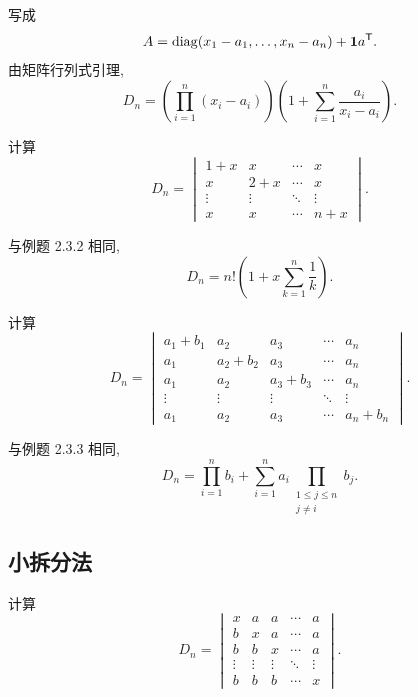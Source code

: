 \begin{solution}
写成
\[
A
=
\operatorname{diag}(x_1-a_1,\ldots,x_n-a_n)
+
\boldsymbol{1}a^{\mathsf T}.
\]
由矩阵行列式引理,
\[
\boxed{
D_n
=
\left(
\prod\limits_{i=1}^{n}(x_i-a_i)
\right)
\left(
1+
\sum\limits_{i=1}^{n}\dfrac{a_i}{x_i-a_i}
\right)
}.
\]
\end{solution}


\begin{example}
计算
\[
D_n=
\begin{vmatrix}
1+x&x&\cdots&x\\
x&2+x&\cdots&x\\
\vdots&\vdots&\ddots&\vdots\\
x&x&\cdots&n+x
\end{vmatrix}.
\]
\end{example}
\exampleblank

\begin{solution}
与例题 2.3.2 相同,
\[
\boxed{
D_n
=
n!
\left(
1+x\sum\limits_{k=1}^{n}\dfrac{1}{k}
\right)
}.
\]
\end{solution}


\begin{example}
计算
\[
D_n=
\begin{vmatrix}
a_1+b_1&a_2&a_3&\cdots&a_n\\
a_1&a_2+b_2&a_3&\cdots&a_n\\
a_1&a_2&a_3+b_3&\cdots&a_n\\
\vdots&\vdots&\vdots&\ddots&\vdots\\
a_1&a_2&a_3&\cdots&a_n+b_n
\end{vmatrix}.
\]
\end{example}
\exampleblank

\begin{solution}
与例题 2.3.3 相同,
\[
\boxed{
D_n
=
\prod\limits_{i=1}^{n}b_i
+
\sum\limits_{i=1}^{n}
a_i
\prod_{\substack{1\leq j\leq n\\j\neq i}}b_j
}.
\]
\end{solution}


\subsection{小拆分法}

\begin{example}
计算
\[
D_n=
\begin{vmatrix}
x&a&a&\cdots&a\\
b&x&a&\cdots&a\\
b&b&x&\cdots&a\\
\vdots&\vdots&\vdots&\ddots&\vdots\\
b&b&b&\cdots&x
\end{vmatrix}.
\]
\end{example}
\exampleblank

